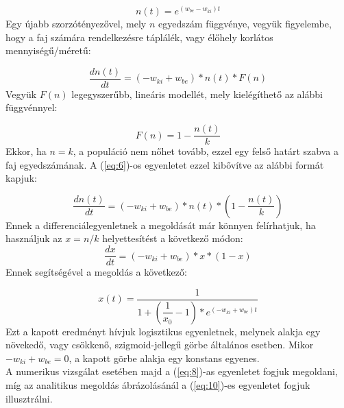 \begin{multicols}{2}
\begin{equation} \label{eq:5}
    n \left( t \right)
    =
    e^{\left( w_{be} - w_{ki} \right) t}
\end{equation}
Egy újabb szorzótényezővel, mely $n$ egyedszám függvénye, vegyük figyelembe, hogy a faj számára rendelkezésre táplálék, vagy élőhely korlátos mennyiségű/méretű:

\begin{equation} \label{eq:6}
    \frac{dn \left( t \right)}{dt}
    =
    \left( -w_{ki} + w_{be} \right) * n \left( t \right) * F \left( n \right)
\end{equation}
Vegyük $F \left( n \right)$ legegyszerűbb, lineáris modellét, mely kielégíthető az alábbi függvénnyel:

\begin{equation} \label{eq:7}
    F \left( n \right)
    =
    1 - \frac{n \left( t \right)}{k}
\end{equation}
Ekkor, ha $n = k$, a populáció nem nőhet tovább, ezzel egy felső határt szabva a faj egyedszámának. A (\ref{eq:6})-os egyenletet ezzel kibővítve az alábbi formát kapjuk:

\begin{equation} \label{eq:8}
    \frac{dn \left( t \right)}{dt}
    =
    \left( -w_{ki} + w_{be} \right) * n \left( t \right) * \left( 1 - \frac{n \left( t \right)}{k} \right)
\end{equation}
Ennek a differenciálegyenletnek a megoldását már könnyen felírhatjuk, ha használjuk az $x = n/k$ helyettesítést a következő módon:
\begin{equation} \label{eq:9}
    \frac{dx}{dt}
    =
    \left( -w_{ki} + w_{be} \right) * x * \left( 1 - x \right)
\end{equation}
Ennek segítségével a megoldás a következő:

\begin{equation} \label{eq:10}
    x \left( t \right)
    =
    \frac{1}{1 + \left( \dfrac{1}{x_{0}} - 1 \right) * e^{\left( -w_{ki} + w_{be} \right) t}}
\end{equation}
Ezt a kapott eredményt hívjuk logisztikus egyenletnek, melynek alakja egy növekedő, vagy csökkenő, szigmoid-jellegű görbe általános esetben. Mikor $-w_{ki} + w_{be} = 0$, a kapott görbe alakja egy konstans egyenes. \\
A numerikus vizsgálat esetében majd a (\ref{eq:8})-as egyenletet fogjuk megoldani, míg az analitikus megoldás ábrázolásánál a (\ref{eq:10})-es egyenletet fogjuk illusztrálni.


\end{multicols}
